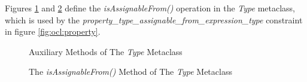 \begin{constraints}
Figures \ref{fig:ocl:type_a} and \ref{fig:ocl:type_b} define the \emph{isAssignableFrom()}
operation in the \emph{Type} metaclass,
which is used by the \emph{property\_type\_assignable\_from\_expression\_type}
constraint in figure \ref{fig:ocl:property}.
\end{constraints}

\begin{figure}

\caption{Auxiliary Methods of The \emph{Type} Metaclass}
\label{fig:ocl:type_a}
\end{figure}

\begin{figure}

\caption{The \emph{isAssignableFrom()} Method of The \emph{Type} Metaclass}
\label{fig:ocl:type_b}
\end{figure}
